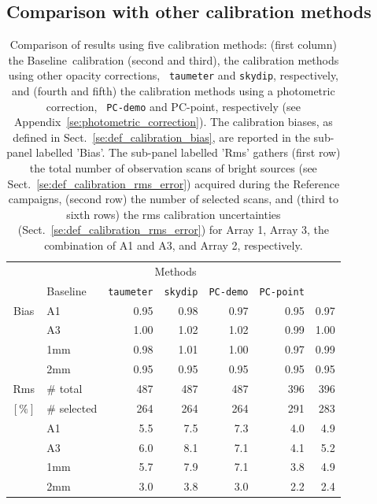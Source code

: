 \documentclass[traditionalabstract]{aa}
\newcommand{\baseline}{Baseline}%
\begin{document}
{\subsection{Comparison with other calibration methods}
\label{se:photometry_others}
\begin{table}[!htbp]
\begin{center}
\caption[Comparison of calibration results using five
  methods]{Comparison of results using five calibration
  methods: (first column) the \baseline\ calibration (second and
  third), the calibration methods using other opacity corrections, {\tt
  taumeter} and {\tt skydip}, respectively, and
  (fourth and fifth) the calibration methods using a photometric correction, {\tt
  PC-demo} and {PC-point}, respectively (see Appendix~\ref{se:photometric_correction}).  
  The calibration biases, as defined in
  Sect.~\ref{se:def_calibration_bias}, are reported in the sub-panel
  labelled 'Bias'. The sub-panel labelled 'Rms' gathers (first row) the total number of
  observation scans of bright sources (see
  Sect.~\ref{se:def_calibration_rms_error}) acquired during
  the Reference campaigns, (second row) the number of selected
  scans, and (third to sixth rows) the rms calibration uncertainties
  (Sect.~\ref{se:def_calibration_rms_error}) for Array 1, Array 3, the
  combination of A1 and A3, and Array 2, respectively. }
\label{tab:Calibration_results_all}
\begin{tabular}{clrrrrr}
  \hline\hline
  \noalign{\smallskip}
  \multicolumn{2}{c}{}  &  \multicolumn{5}{c}{Methods} \\\cline{3-7}
  \noalign{\smallskip}
  \multicolumn{2}{c}{Characteristics} &  \baseline\  & {\small {\tt taumeter}}  & {\small {\tt skydip}}  &  {\small {\tt PC-demo}} & {\small {\tt PC-point}} \\
  \hline
  \noalign{\smallskip}
  Bias &  A1            &   0.95   &  0.98    &  0.97    &   0.95    &  0.97  \\
       &  A3            &   1.00   &  1.02    &  1.02    &   0.99    &  1.00  \\
       &  1mm           &   0.98   &  1.01    &  1.00    &   0.97    &  0.99  \\
       &  2mm           &   0.95   &  0.95    &  0.95    &   0.95    &  0.95  \\
  \hline
  \noalign{\smallskip}
  Rms  &  $\#$ total      &   487    &    487   &    487    &    396    &  396 \\
  $[\%]$ &  $\#$ selected &   264    &    264   &    264    &    291    &  283 \\
       &  A1            &   5.5    &    7.5   &    7.3    &    4.0    &  4.9 \\
       &  A3            &   6.0    &    8.1   &    7.1    &    4.1    &  5.2 \\
       &  1mm           &   5.7    &    7.9   &    7.1    &    3.8    &  4.9 \\
       &  2mm           &   3.0    &    3.8   &    3.0    &    2.2    &  2.4 \\
\hline
\end{tabular}
\end{center}
\end{table}

}
\end{document}
